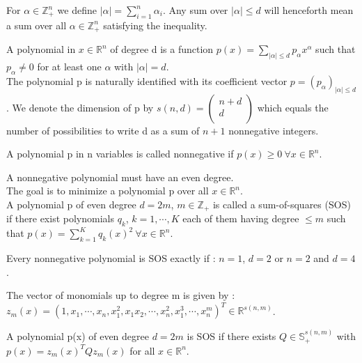 \documentclass[../main.tex]{subfiles}
\begin{document}
For $\alpha \in \mathbb{Z}_+^n$ we define $\lvert \alpha \rvert = \sum_{i=1}^n \alpha_i$. Any sum over $\lvert \alpha \rvert \leq d$ will henceforth mean a sum over all $\alpha \in \mathbb{Z}_+^n$ satisfying the inequality. 

\begin{theorem}
    A polynomial in $x \in \mathbb{R}^n$ of degree d is a function $p(x) = \sum_{\lvert \alpha \rvert \leq d} p_\alpha x^\alpha$ such that $p_\alpha \neq 0$ for at least one $\alpha$ with $\lvert \alpha \rvert = d$. \\
The polynomial p is naturally identified with its coefficient vector $p= (p_\alpha)_{\lvert \alpha \rvert \leq d}$. We denote the dimension of p by $s(n,d) = \begin{pmatrix}
    n+d\\ d\\
\end{pmatrix}$ which equals the number of possibilities to write d as a sum of $n+1$
 nonnegative integers.
\end{theorem}

\begin{theorem}
    A polynomial p in n variables is called nonnegative if $p(x) \geq 0 \: \forall x\in \mathbb{R}^n$. 
\end{theorem}
\warning A nonnegative polynomial must have an even degree.\\
The goal is to minimize a polynomial p over all $x\in \mathbb{R}^n$. \\

A polynomial p of even degree $d=2m$, $m\in \mathbb{Z}_+$ is called a sum-of-squares (SOS) if there exist polynomials $q_k$, $k=1,\cdots, K$ each of them having degree $\leq m$ such that $p(x) = \sum_{k=1}^K q_k(x)^2 \: \forall x\in \mathbb{R}^n$. \begin{theorem}Every nonnegative polynomial is SOS exactly if : $n=1$, $d=2$ or $n=2$ and $d=4$.\end{theorem}

The vector of monomials up to degree m is given by : $z_m (x) = (1, x_1, \cdots, x_n, x_1^2, x_1x_2, \cdots, x_n^2, x_1^3, \cdots, x_n^m)^T \in \mathbb{R}^{s(n,m)}$.\\

\begin{theorem}
    A polynomial p(x) of even degree $d=2m$ is SOS if there exists $Q \in \mathbb{S}_+^{s(n,m)}$ with $p(x) = z_m (x)^T Q z_m(x)$ for all $x\in \mathbb{R}^n$.
\end{theorem}
\end{document}
